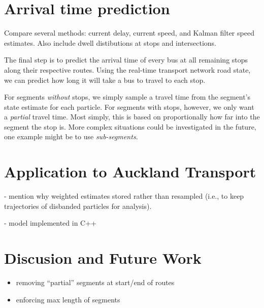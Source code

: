 \documentclass[draftcls,a4paper,onecolumn]{IEEEtran}\usepackage[]{graphicx}\usepackage[]{color}
\begin{document}
\section{Arrival time prediction}
\label{sec:arrival_time}


Compare several methods:
current delay, current speed, and Kalman filter speed estimates.
Also include dwell distibutions at stops and intersections.


The final step is to predict the arrival time of every bus 
at all remaining stops along their respective routes.
Using the real-time transport network road state, 
we can predict how long it will take a bus to travel 
to each stop.


For segments \emph{without} stops,
we simply sample a travel time from the segment's state estimate
for each particle.
For segments with stops, however,
we only want a \emph{partial} travel time.
Most simply, this is based on proportionally how far into the segment
the stop is.
More complex situations could be investigated in the future,
one example might be to use \emph{sub-segments}.



\section{Application to Auckland Transport}
\label{sec:results}

- mention why weighted estimates stored rather than resampled 
(i.e., to keep trajectories of disbanded particles for analysis).

- model implemented in C++


\section{Discusion and Future Work}
\label{sec:discussion}

\begin{itemize}
\item removing ``partial'' segments at start/end of routes
\item enforcing max length of segments
\end{itemize}






\end{document}
